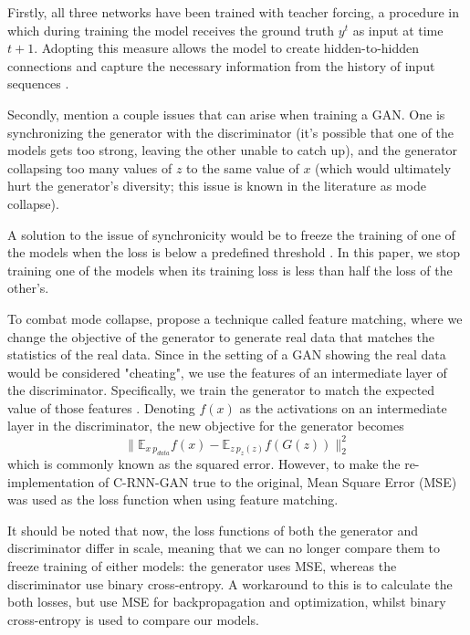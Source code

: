 \documentclass[a4paper]{book}
\begin{document}
Firstly, all three networks have been trained with teacher forcing, a procedure in which during training the model receives the ground truth $y^t$ as input at time $t+1$. Adopting this measure allows the model to create hidden-to-hidden connections and capture the necessary information from the history of input sequences \parencite{goodfellow_deep_2016}.

Secondly, \textcite{goodfellow_generative_2014} mention a couple issues that can arise when training a GAN. One is synchronizing the generator with the discriminator (it's possible that one of the models gets too strong, leaving the other unable to catch up), and the generator collapsing too many values of $z$ to the same value of $x$ (which would ultimately hurt the generator's diversity; this issue is known in the literature as mode collapse).

A solution to the issue of synchronicity would be to freeze the training of one of the models when the loss is below a predefined threshold \parencite{mogren_c-rnn-gan_2016}. In this paper, we stop training one of the models when its training loss is less than half the loss of the other's.

To combat mode collapse, \textcite{salimans_improved_2016} propose a technique called feature matching, where we change the objective of the generator to generate real data that matches the statistics of the real data. Since in the setting of a GAN showing the real data would be considered "cheating", we use the features of an intermediate layer of the discriminator. Specifically, we train the generator to match the expected value of those features \parencite{salimans_improved_2016}. Denoting $f(x)$ as the activations on an intermediate layer in the discriminator, the new objective for the generator becomes
\begin{equation}
    \|\mathbb{E}_{x~p_{data}} f(x) - \mathbb{E}_{z~p_z (z)} f(G(z))\|_2^2
\end{equation}
which is commonly known as the squared error. However, to make the re-implementation of C-RNN-GAN true to the original, Mean Square Error (MSE) was used as the loss function when using feature matching.

It should be noted that now, the loss functions of both the generator and discriminator differ in scale, meaning that we can no longer compare them to freeze training of either models: the generator uses MSE, whereas the discriminator use binary cross-entropy. A workaround to this is to calculate the both losses, but use MSE for backpropagation and optimization, whilst binary cross-entropy is used to compare our models.
\end{document}

